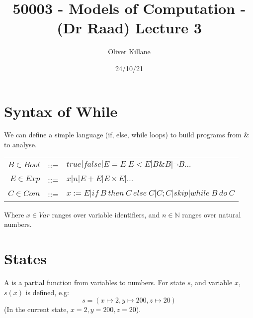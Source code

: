 \documentclass{report}
\title{50003 - Models of Computation - (Dr Raad) Lecture 3}
\author{Oliver Killane}
\date{24/10/21}
\begin{document}
\maketitle
{}

\section*{Syntax of While}
We can define a simple  language (if, else, while loops) to build programs from \& to analyse.
\begin{center}
	\begin{tabular}{r c l}
		$B \in Bool$ & ::= & $true | false | E = E | E < E | B \& B | \neg B \dots$                   \\
		$E \in Exp$  & ::= & $x | n | E + E | E \times E | \dots$                                     \\
		$C \in Com$  & ::= & $x :=E | if \ B \ then \ C \ else \ C | C;C | skip | while \ B \ do \ C$ \\
	\end{tabular}
\end{center}
Where $x \in Var$ ranges over variable identifiers, and $n \in \mathbb{N}$ ranges over natural numbers.

\section*{States}
A  is a partial function from variables to numbers. For state $s$, and variable $x$, $s(x)$ is defined, e.g:
\[s = (x \mapsto 2, y \mapsto 200, z \mapsto 20)\]
(In the current state, $x = 2, y = 200, z = 20$).
\end{document}
